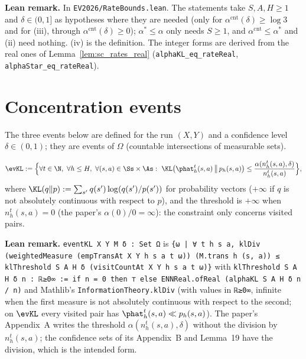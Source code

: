 \textbf{Lean remark.} In \texttt{EV2026/RateBounds.lean}. The statements take $S, A, H \ge 1$
and $\delta \in (0, 1]$ as hypotheses where they are needed (only for $\alpha^{\mathrm{cnt}}(\delta) \ge \log 3$
and for (iii), through $\alpha^{\mathrm{cnt}}(\delta) \ge 0$); $\alpha^* \le \alpha$ only needs $S \ge 1$, and
$\alpha^{\mathrm{cnt}} \le \alpha^*$ and (ii) need nothing. (iv) is the definition. The integer forms are
derived from the real ones of Lemma~\ref{lem:sc_rates_real}
(\texttt{alphaKL\_eq\_rateReal}, \texttt{alphaStar\_eq\_rateReal}).

\section{Concentration events}
\label{sec:empirical_events}

The three events below are defined for the run $(X, Y)$ and a confidence level
$\delta \in (0, 1)$; they are events of $\Omega$ (countable intersections of measurable sets).

\begin{definition}\label{def:event_kl}
\leanok
{}
\[
  \evKL := \Big\{ \forall t \in \N,\ \forall h \le H,\ \forall (s, a) \in \Ss \times \As :\
    \KL\big(\phat_h^t(s, a) \,\big\|\, p_h(s, a)\big) \le \frac{\alpha(n_h^t(s, a), \delta)}{n_h^t(s, a)} \Big\},
\]
where $\KL(q \| p) := \sum_{s'} q(s') \log(q(s')/p(s'))$ for probability vectors ($+\infty$ if
$q$ is not absolutely continuous with respect to $p$), and the threshold is $+\infty$ when
$n_h^t(s, a) = 0$ (the paper's $\alpha(0)/0 = \infty$): the constraint only concerns visited pairs.
\end{definition}

\textbf{Lean remark.} \texttt{eventKL X Y M δ : Set Ω} is
\texttt{\{ω | ∀ t h s a, klDiv (weightedMeasure (empTransAt X Y h s a t ω)) (M.trans h (s, a)) ≤ klThreshold S A H δ (visitCountAt X Y h s a t ω)\}}
with \texttt{klThreshold S A H δ n : ℝ≥0∞ := if n = 0 then ⊤ else ENNReal.ofReal (alphaKL S A H δ n / n)}
and Mathlib's \texttt{InformationTheory.klDiv} (with values in \texttt{ℝ≥0∞}, infinite when the
first measure is not absolutely continuous with respect to the second; on $\evKL$ every
visited pair has $\phat_h^t(s, a) \ll p_h(s, a)$). The paper's Appendix~A writes the threshold
$\alpha(n_h^t(s, a), \delta)$ without the division by $n_h^t(s, a)$; the confidence sets of its
Appendix~B and Lemma~19 have the division, which is the intended form.


